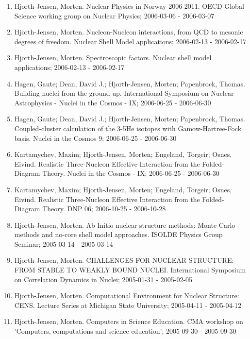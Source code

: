 \documentclass[a4wide,10pt]{article}
\begin{document}
\begin{enumerate}
\item Hjorth-Jensen, Morten.  Nuclear Physics in Norway 2006-2011. OECD Global Science working group on Nuclear Physics; 2006-03-06 - 2006-03-07

\item Hjorth-Jensen, Morten.  Nucleon-Nucleon interactions, from QCD to mesonic degrees of freedom. Nuclear Shell Model applications; 2006-02-13 - 2006-02-17

\item Hjorth-Jensen, Morten.  Spectroscopic factors. Nuclear shell model applications; 2006-02-13 - 2006-02-17

\item Hagen, Gaute; Dean, David J.; Hjorth-Jensen, Morten; Papenbrock, Thomas.  Building nuclei from the ground up. International Symposium on Nuclear Astrophysics - Nuclei in the Cosmos - IX; 2006-06-25 - 2006-06-30

\item Hagen, Gaute; Dean, David J.; Hjorth-Jensen, Morten; Papenbrock, Thomas.  Coupled-cluster calculation of the 3-5He isotopes with Gamow-Hartree-Fock basis. Nuclei in the Cosmos 9; 2006-06-25 - 2006-06-30

\item Kartamychev, Maxim; Hjorth-Jensen, Morten; Engeland, Torgeir; Osnes, Eivind.  Realistic Three-Nucleon Effective Interaction from the Folded-Diagram Theory. Nuclei in the Cosmos - IX; 2006-06-25 - 2006-06-30

\item Kartamychev, Maxim; Hjorth-Jensen, Morten; Engeland, Torgeir; Osnes, Eivind. Realistic Three-Nucleon Effective Interaction from the Folded-Diagram Theory. DNP 06; 2006-10-25 - 2006-10-28

\item Hjorth-Jensen, Morten.  Ab Initio nuclear structure methods: Monte Carlo methods and no-core shell model approaches. ISOLDE Physics Group Seminar; 2005-03-14 - 2005-03-14

\item Hjorth-Jensen, Morten. CHALLENGES FOR NUCLEAR STRUCTURE: FROM STABLE TO WEAKLY BOUND NUCLEI. International Symposium on Correlation Dynamics in Nuclei; 2005-01-31 - 2005-02-05

\item Hjorth-Jensen, Morten.  Computational Environment for Nuclear Structure: CENS. Lecture Series at Michigan State University; 2005-04-11 - 2005-04-12

\item Hjorth-Jensen, Morten.  Computers in Science Education. CMA workshop on 'Computers, computations and science education'; 2005-09-30 - 2005-09-30


\end{enumerate}
\end{document}
